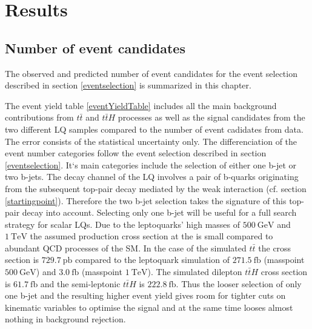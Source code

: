 \chapter{Results}
\section{Number of event candidates}\label{eventYield}
The observed and predicted number of event candidates for the event selection described in section \ref{eventselection} is summarized in this chapter.\par
The event yield table \ref{eventYieldTable} includes all the main background contributions from $t\bar{t}$ and $t\bar{t}H$ processes as well as the signal candidates from the two different LQ samples compared to the number of event cadidates from data. The error consists of the statistical uncertainty only. The differenciation of the event number categories follow the event selection described in section \ref{eventselection}. It`s main categories include the selection of either one b-jet or two b-jets. The decay channel of the LQ involves a pair of b-quarks originating from the subsequent top-pair decay mediated by the weak interaction (cf. section \ref{startingpoint}). Therefore the two b-jet selection takes the signature of this top-pair decay into account. Selecting only one b-jet will be useful for a full search strategy for scalar LQs. Due to the leptoquarks' high masses of $\SI{500}{\giga\electronvolt}$ and $\SI{1}{\tera\electronvolt}$ the assumed production cross section at the {\LHC} is small compared to abundant QCD processes of the SM. In the case of the simulated $t\bar{t}$ the cross section is $\SI{729.7}{\pico\barn}$ compared to the leptoquark simulation of $\SI{271.5}{\femto\barn}$ (masspoint $\SI{500}{\giga\electronvolt}$) and $\SI{3.0}{\femto\barn}$ (masspoint $\SI{1}{\tera\electronvolt}$). The simulated dilepton $t\bar{t}H$ cross section is $\SI{61.7}{\femto\barn}$ and the semi-leptonic $t\bar{t}H$ is $\SI{222.8}{\femto\barn}$. Thus the looser selection of only one b-jet and the resulting higher event yield gives room for tighter cuts on kinematic variables to optimise the signal and at the same time looses almost nothing in background rejection. \newline
